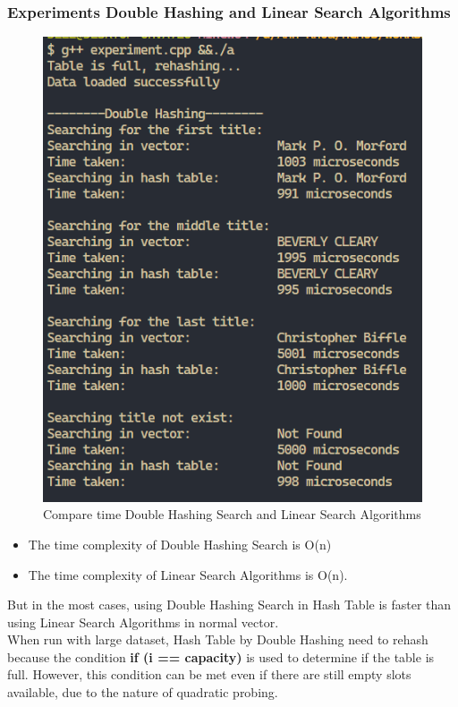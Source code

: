 \subsubsection{Experiments Double Hashing and Linear Search Algorithms}
\begin{figure}[H]
	\centering
	\includegraphics[width=0.7\linewidth]{img/DoubleHash/compare.PNG}
	\caption{Compare time Double Hashing Search and Linear Search Algorithms}
\end{figure}

\begin{itemize}
	\item The time complexity of Double Hashing Search is O(n)
	\item The time complexity of Linear Search Algorithms is O(n).
\end{itemize}
But in the most cases, using Double Hashing Search in Hash Table is faster than using Linear Search Algorithms in normal vector.\\

When run with large dataset, Hash Table by Double Hashing need to rehash because the condition \textbf{ if (i == capacity)} is used to determine if the table is full. However, this condition can be met even if there are still empty slots available, due to the nature of quadratic probing.
